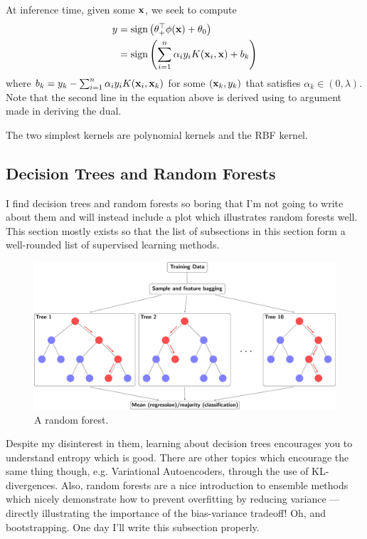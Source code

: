 \documentclass[11pt]{article}
\begin{document}
At inference time, given some $\mathbf{x}$, we seek to compute
\begin{align*}
    y
    &=
    \text{sign}\left(\theta_+^\top\phi(\mathbf{x})+\theta_0\right)\\
    &=
    \text{sign}\left(\sum_{i=1}^n\alpha_iy_iK(\mathbf{x}_i,\mathbf{x})+b_k\right)
\end{align*}
where $b_k=y_k-\sum_{i=1}^n\alpha_iy_iK(\mathbf{x}_i,\mathbf{x}_k)$ for some $(\mathbf{x}_k,y_k)$ that satisfies $\alpha_k\in(0,\lambda)$. Note that the second line in the equation above is derived using to argument made in deriving the dual.

The two simplest kernels are polynomial kernels and the RBF kernel. 

\subsection{Decision Trees and Random Forests}
I find decision trees and random forests so boring that I'm not going to write about them and will instead include a plot which illustrates random forests well. This section mostly exists so that the list of subsections in this section form a well-rounded list of supervised learning methods.

\begin{figure}[t]
    \centering
    \includegraphics[width=\columnwidth]{./figures/supervised_learning/random_forest.pdf}
    \caption{A random forest.}
    \label{fig:random_forest}
\end{figure}

Despite my disinterest in them, learning about decision trees encourages you to understand entropy which is good. There are other topics which encourage the same thing though, e.g. Variational Autoencoders, through the use of KL-divergences. Also, random forests are a nice introduction to ensemble methods which nicely demonstrate how to prevent overfitting by reducing variance — directly illustrating the importance of the bias-variance tradeoff! Oh, and bootstrapping. One day I'll write this subsection properly.
\end{document}

